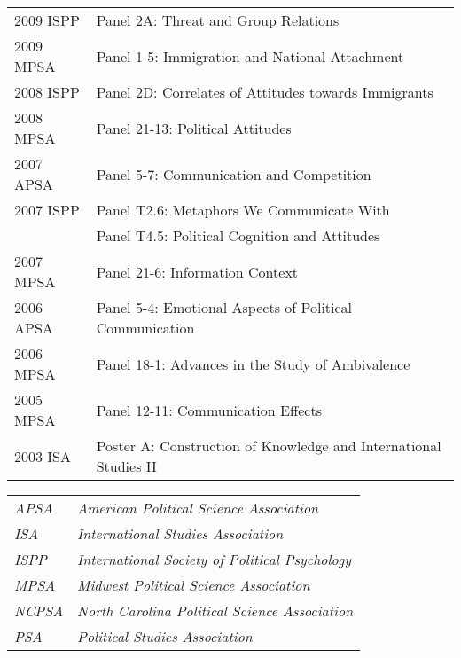\documentclass[12pt]{article}
\begin{document}
\begin{longtable}{@{}p{3.5cm}@{}l}
            2009 ISPP & {Panel 2A: Threat and Group Relations}\\
            
            2009 MPSA & {Panel 1-5: Immigration and National Attachment}\\
            
            2008 ISPP & {Panel 2D: Correlates of Attitudes towards Immigrants}\\
            
            2008 MPSA & {Panel 21-13: Political Attitudes}\\
            
            2007 APSA & {Panel 5-7: Communication and Competition}\\
            
            2007 ISPP & {Panel T2.6: Metaphors We Communicate With}\\
            
            & {Panel T4.5: Political Cognition and Attitudes}\\
            
            2007 MPSA & {Panel 21-6: Information Context}\\
            
            2006 APSA & {Panel 5-4: Emotional Aspects of 
            Political Communication}\\
            
            2006 MPSA & {Panel 18-1: Advances in the Study of Ambivalence}\\
            
            2005 MPSA & {Panel 12-11: Communication Effects}\\
            
            2003 ISA & {Poster A: Construction of 
            Knowledge and International Studies II}\\

\end{longtable}
		
\vspace*{.25cm}

\begin{longtable}{@{}p{3.5cm}@{}l}%
\textit{APSA} & \textit{American Political Science Association}\\
\textit{ISA} & \textit{International Studies Association}\\
\textit{ISPP} & \textit{International Society of Political Psychology}\\
\textit{MPSA} & \textit{Midwest Political Science Association}\\
\textit{NCPSA} & \textit{North Carolina Political Science Association}\\
\textit{PSA} & \textit{Political Studies Association}\\
\end{longtable}
\end{document}
